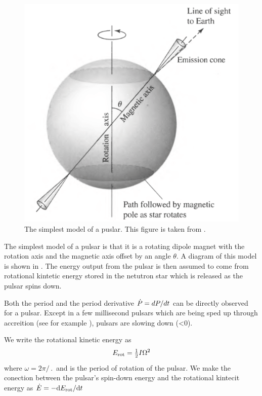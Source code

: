 \begin{figure}[htpb]
  \begin{center}
    \includegraphics[width=\textwidth]{chapters/introduction/figures/pulsar_model.pdf}
  \end{center}
  \caption{The simplest model of a puslar. This
  figure is taken from \citep{carroll_2006_introduction-modern}.
  }
\end{figure}

The simplest model of a pulsar is that it is a rotating dipole magnet
with the rotation axis and the magnetic axis offset by an angle
$\theta$.
A diagram of this model is shown in .
The energy output from the pulsar is
then assumed 
to come from rotational kintetic energy stored in
the netutron star which is released as the pulsar
spins down. 

Both the period \period and the period derivative
$\dot{P}=dP/dt$ can be directly observed for a pulsar.
Except in a few millisecond pulsars which are being sped up
through accreition (see for example \cite{falanga_2005_integral-observations}),
pulsars are slowing down (\perioddot<0).

We write the rotational kinetic energy as
\begin{equation}
  E_\text{rot} = \tfrac{1}{2} I \Omega^2
\end{equation}
where $\omega = 2\pi/\period$ and \period is the period of
rotation of the pulsar. We make the conection between
the pulsar's spin-down energy and the rotational kintecit energy as
$\dot{E} = - \text{d}E_\text{rot}/\text{d}t$

